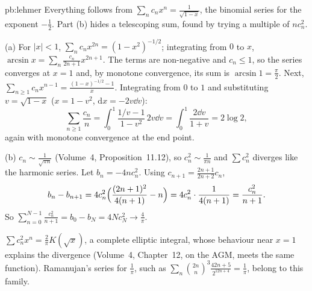 \begin{solution}{pb:lehmer}
\idea Everything follows from $\sum_nc_nx^n=\frac1{\sqrt{1-x}}$, the binomial series for the exponent $-\frac12$. Part (b) hides a telescoping
sum, found by trying a multiple of $nc_n^2$.

\writeup (a) For $|x|<1$, $\sum_nc_nx^{2n}=(1-x^2)^{-1/2}$; integrating from $0$ to $x$, $\arcsin x=\sum_n\frac{c_n}{2n+1}x^{2n+1}$. The terms are
non-negative and $c_n\le1$, so the series converges at $x=1$ and, by monotone convergence, its sum is $\arcsin1=\frac\pi2$. Next,
$\sum_{n\ge1}c_nx^{n-1}=\frac{(1-x)^{-1/2}-1}x$. Integrating from $0$ to $1$ and substituting $v=\sqrt{1-x}$ ($x=1-v^2$, $\mathrm dx=-2v\dd v$):
\[
\sum_{n\ge1}\frac{c_n}n=\int_0^1\frac{1/v-1}{1-v^2}\,2v\dd v=\int_0^1\frac{2\dd v}{1+v}=2\log2,
\]
again with monotone convergence at the end point.

(b) $c_n\sim\frac1{\sqrt{\pi n}}$ (Volume~4, Proposition~11.12), so $c_n^2\sim\frac1{\pi n}$ and $\sum c_n^2$ diverges like the harmonic series. Let $b_n=-4nc_n^2$. Using
$c_{n+1}=\frac{2n+1}{2n+2}c_n$,
\[
b_n-b_{n+1}=4c_n^2\Bigl(\frac{(2n+1)^2}{4(n+1)}-n\Bigr)=4c_n^2\cdot\frac1{4(n+1)}=\frac{c_n^2}{n+1}.
\]
So $\sum_{n=0}^{N-1}\frac{c_n^2}{n+1}=b_0-b_N=4Nc_N^2\to\frac4\pi$.

\leads $\sum c_n^2x^n=\frac2\pi K(\sqrt x)$, a complete elliptic integral, whose behaviour near $x=1$ explains the divergence (Volume~4, Chapter~12, on the
AGM, meets the same function). Ramanujan's series for $\frac1\pi$, such as $\sum_n\binom{2n}n^3\frac{42n+5}{2^{12n+4}}=\frac1\pi$, belong to this family.
\end{solution}

